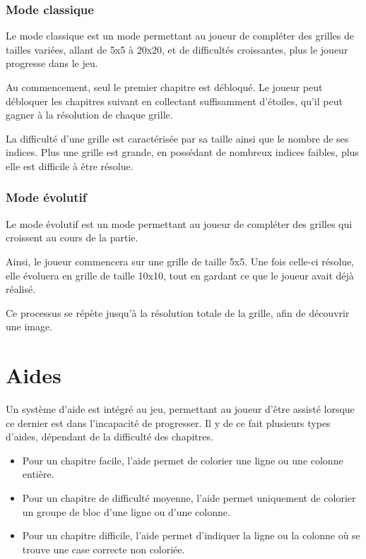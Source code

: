 \documentclass[a4paper, 12pt]{report}
\begin{document}
		\subsubsection{Mode classique}
		
		    Le mode classique est un mode permettant au joueur de compléter des grilles de tailles variées, allant de 5x5 à 20x20, et de difficultés croissantes, plus le joueur progresse dans le jeu.
		    
		    Au commencement, seul le premier chapitre est débloqué. Le joueur peut débloquer les chapitres suivant en collectant suffisamment d'étoiles, qu'il peut gagner à la résolution de chaque grille.
		    
		    La difficulté d'une grille est caractérisée par sa taille ainsi que le nombre de ses indices. Plus une grille est grande, en possédant de nombreux indices faibles, plus elle est difficile à être résolue.
		    
		\subsubsection{Mode évolutif}
		
		    Le mode évolutif est un mode permettant au joueur de compléter des grilles qui croissent au cours de la partie.
		    
		    Ainsi, le joueur commencera sur une grille de taille 5x5. Une fois celle-ci résolue, elle évoluera en grille de taille 10x10, tout en gardant ce que le joueur avait déjà réalisé. 
		    
		    Ce processus se répète jusqu'à la résolution totale de la grille, afin de découvrir une image.
			

		\section{Aides}
		
			Un système d'aide est intégré au jeu, permettant au joueur d'être assisté lorsque ce dernier est dans l'incapacité de progresser. Il y de ce fait plusieurs types d'aides, dépendant de la difficulté des chapitres.
			\begin{itemize}
			\item Pour un chapitre facile, l'aide permet de colorier une ligne ou une colonne entière. 
			
			\item Pour un chapitre de difficulté moyenne, l'aide permet uniquement de colorier un groupe de bloc d'une ligne ou d'une colonne. 
			
			\item Pour un chapitre difficile, l'aide permet d'indiquer la ligne ou la colonne où se trouve une case correcte non coloriée. 
			\end{itemize}
			
\end{document}
